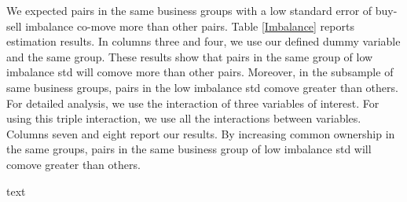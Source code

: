 	We expected pairs in the same business groups with a low standard error of buy-sell imbalance co-move more than other pairs. Table \ref{Imbalance} reports estimation results. In columns three and four, we use our defined dummy variable and the same group. These results show that pairs in the same group of low imbalance std will comove more than other pairs. Moreover, in the subsample of same business groups, pairs in the low imbalance std comove greater than others.  For detailed analysis, we use the interaction of three variables of interest. For using this triple interaction, we use all the interactions between variables. Columns seven and eight report our results. By increasing common ownership in the same groups, pairs in the same business group of low imbalance std will comove greater than others.
	
		{\begin{table}[htbp]
			\centering
			\caption{text}
			\label{Imbalance}
			\resizebox{\textwidth}{!}{
				
			}
	\end{table}}

